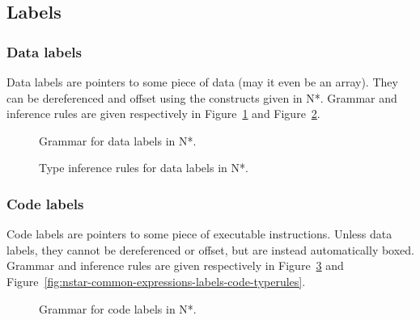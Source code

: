 \subsection{Labels}\label{subsec:nstar-common-expressions-labels}

\subsubsection{Data labels}\label{subsubsec:nstar-common-expressions-labels-data}

Data labels are pointers to some piece of data (may it even be an array).
They can be dereferenced and offset using the constructs given in N*.
Grammar and inference rules are given respectively in Figure~\ref{fig:nstar-common-expressions-labels-data-grammar} and Figure~\ref{fig:nstar-common-expressions-labels-data-typerules}.

\begin{figure}[H]
  \centering

  \caption{Grammar for data labels in N*.}
  \label{fig:nstar-common-expressions-labels-data-grammar}
\end{figure}

\begin{figure}[H]
  \centering

  \begin{prooftree}
  \end{prooftree}

  \caption{Type inference rules for data labels in N*.}
  \label{fig:nstar-common-expressions-labels-data-typerules}
\end{figure}

\subsubsection{Code labels}\label{subsubsec:nstar-common-expressions-labels-code}

Code labels are pointers to some piece of executable instructions.
Unless data labels, they cannot be dereferenced or offset, but are instead automatically boxed.
Grammar and inference rules are given respectively in Figure~\ref{fig:nstar-common-expressions-labels-code-grammar} and Figure~\ref{fig:nstar-common-expressions-labels-code-typerules}.

\begin{figure}[H]
  \centering

  \caption{Grammar for code labels in N*.}
  \label{fig:nstar-common-expressions-labels-code-grammar}
\end{figure}

